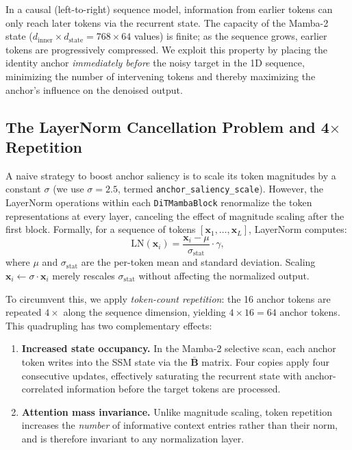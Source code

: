 \documentclass[12pt,letterpaper]{report}
\begin{document}
In a causal (left-to-right) sequence model, information from earlier tokens
can only reach later tokens via the recurrent state. The capacity of the
Mamba-2 state ($d_{\mathrm{inner}} \times d_{\mathrm{state}} = 768 \times 64$
values) is finite; as the sequence grows, earlier tokens are progressively
compressed. We exploit this property by placing the identity anchor
\emph{immediately before} the noisy target in the 1D sequence, minimizing the
number of intervening tokens and thereby maximizing the anchor's influence on
the denoised output. %

\subsection{The LayerNorm Cancellation Problem and \texorpdfstring{4$\times$}{4x} Repetition}

A naive strategy to boost anchor saliency is to scale its token magnitudes by
a constant $\sigma$ (we use $\sigma = 2.5$, termed \texttt{anchor\_saliency\_scale}).
However, the LayerNorm operations within each \texttt{DiTMambaBlock}
renormalize the token representations at every layer, canceling the effect of
magnitude scaling after the first block. Formally, for a sequence of tokens
$[\mathbf{x}_1, \ldots, \mathbf{x}_L]$, LayerNorm computes:
%
\begin{equation}
    \mathrm{LN}(\mathbf{x}_i) = \frac{\mathbf{x}_i - \mu}{\sigma_{\mathrm{stat}}} \cdot \gamma,
\end{equation}
%
where $\mu$ and $\sigma_{\mathrm{stat}}$ are the per-token mean and standard
deviation. Scaling $\mathbf{x}_i \leftarrow \sigma \cdot \mathbf{x}_i$ merely
rescales $\sigma_{\mathrm{stat}}$ without affecting the normalized output. %

To circumvent this, we apply \emph{token-count repetition}: the 16 anchor
tokens are repeated $4\times$ along the sequence dimension, yielding $4 \times
16 = 64$ anchor tokens. This quadrupling has two complementary effects: %

\begin{enumerate}
    \item \textbf{Increased state occupancy.} In the Mamba-2 selective scan,
        each anchor token writes into the SSM state via the $\bar{\mathbf{B}}$
        matrix. Four copies apply four consecutive updates, effectively
        saturating the recurrent state with anchor-correlated information before
        the target tokens are processed.
    \item \textbf{Attention mass invariance.} Unlike magnitude scaling, token
        repetition increases the \emph{number} of informative context entries
        rather than their norm, and is therefore invariant to any normalization
        layer.
\end{enumerate}
\end{document}
